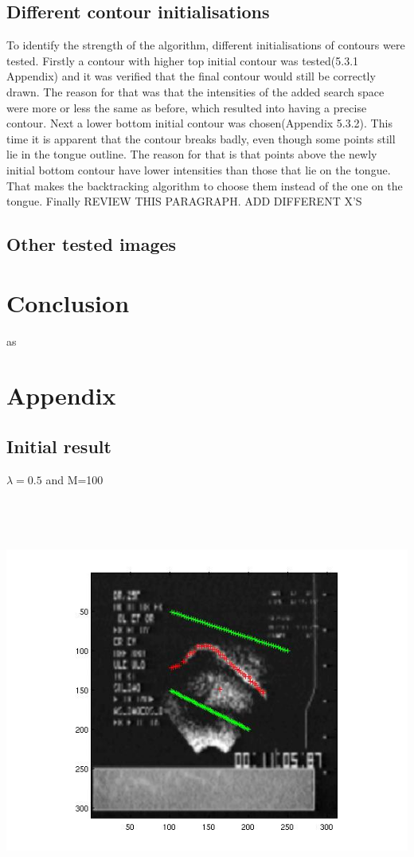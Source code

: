 \documentclass[12pt,a4paper,twocolumn]{article}
\begin{document}
\subsection{Different contour initialisations}
To identify the strength of the algorithm, different initialisations of contours were tested.
Firstly a contour with higher top initial contour was tested(5.3.1 Appendix) and it was verified that the final contour would still be correctly drawn. The reason for that was that the intensities of the added search space were more or less the same as before, which resulted into having a precise contour. Next a lower bottom initial contour was chosen(Appendix 5.3.2). This time it is apparent that the contour breaks badly, even though some points still lie in the tongue outline. The reason for that is that points above the newly initial bottom contour have lower intensities than those that lie on the tongue. That makes the backtracking algorithm to choose them instead of the one on the tongue.
Finally REVIEW THIS PARAGRAPH. ADD DIFFERENT X'S
\subsection{Other tested images}
\section{Conclusion}
as
\newpage
\mbox{}

\newpage
\mbox{}
\section{Appendix}
\subsection{Initial result}
$\lambda=0.5$ and M=100
\newline
\includegraphics[width=500pt,height=400pt,scale=1]{points_1_to_7.jpg}
\newpage
\mbox{}
\newpage
\end{document}
